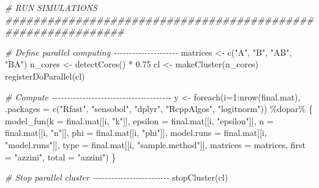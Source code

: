 \documentclass[
  11pt,
]{article}
\newenvironment{Shaded}{\begin{snugshade}}{\end{snugshade}}
\newcommand{\AttributeTok}[1]{\textcolor[rgb]{0.77,0.63,0.00}{#1}}
\newcommand{\CommentTok}[1]{\textcolor[rgb]{0.56,0.35,0.01}{\textit{#1}}}
\newcommand{\DecValTok}[1]{\textcolor[rgb]{0.00,0.00,0.81}{#1}}
\newcommand{\FloatTok}[1]{\textcolor[rgb]{0.00,0.00,0.81}{#1}}
\newcommand{\FunctionTok}[1]{\textcolor[rgb]{0.00,0.00,0.00}{#1}}
\newcommand{\NormalTok}[1]{#1}
\newcommand{\OtherTok}[1]{\textcolor[rgb]{0.56,0.35,0.01}{#1}}
\newcommand{\SpecialCharTok}[1]{\textcolor[rgb]{0.00,0.00,0.00}{#1}}
\newcommand{\StringTok}[1]{\textcolor[rgb]{0.31,0.60,0.02}{#1}}
\begin{document}
\begin{Shaded}
\begin{Highlighting}[]
\CommentTok{\# RUN SIMULATIONS \#\#\#\#\#\#\#\#\#\#\#\#\#\#\#\#\#\#\#\#\#\#\#\#\#\#\#\#\#\#\#\#\#\#\#\#\#\#\#\#\#\#\#\#\#\#\#\#\#\#\#\#\#\#\#\#\#\#\#\#\#}

\CommentTok{\# Define parallel computing {-}{-}{-}{-}{-}{-}{-}{-}{-}{-}{-}{-}{-}{-}{-}{-}{-}{-}{-}{-}{-}}
\NormalTok{matrices }\OtherTok{\textless{}{-}} \FunctionTok{c}\NormalTok{(}\StringTok{"A"}\NormalTok{, }\StringTok{"B"}\NormalTok{, }\StringTok{"AB"}\NormalTok{, }\StringTok{"BA"}\NormalTok{)}
\NormalTok{n\_cores }\OtherTok{\textless{}{-}} \FunctionTok{detectCores}\NormalTok{() }\SpecialCharTok{*} \FloatTok{0.75}
\NormalTok{cl }\OtherTok{\textless{}{-}} \FunctionTok{makeCluster}\NormalTok{(n\_cores)}
\FunctionTok{registerDoParallel}\NormalTok{(cl)}

\CommentTok{\# Compute {-}{-}{-}{-}{-}{-}{-}{-}{-}{-}{-}{-}{-}{-}{-}{-}{-}{-}{-}{-}{-}{-}{-}{-}{-}{-}{-}{-}{-}{-}{-}{-}{-}{-}{-}{-}{-}{-}{-}}
\NormalTok{y }\OtherTok{\textless{}{-}} \FunctionTok{foreach}\NormalTok{(}\AttributeTok{i=}\DecValTok{1}\SpecialCharTok{:}\FunctionTok{nrow}\NormalTok{(final.mat),}
             \AttributeTok{.packages =} \FunctionTok{c}\NormalTok{(}\StringTok{"Rfast"}\NormalTok{, }\StringTok{"sensobol"}\NormalTok{, }\StringTok{"dplyr"}\NormalTok{, }\StringTok{"RcppAlgos"}\NormalTok{,}
                           \StringTok{"logitnorm"}\NormalTok{)) }\SpecialCharTok{\%dopar\%}
\NormalTok{  \{}
    \FunctionTok{model\_fun}\NormalTok{(}\AttributeTok{k =}\NormalTok{ final.mat[[i, }\StringTok{"k"}\NormalTok{]],}
              \AttributeTok{epsilon =}\NormalTok{ final.mat[[i, }\StringTok{"epsilon"}\NormalTok{]],}
              \AttributeTok{n =}\NormalTok{ final.mat[[i, }\StringTok{"n"}\NormalTok{]],}
              \AttributeTok{phi =}\NormalTok{ final.mat[[i, }\StringTok{"phi"}\NormalTok{]],}
              \AttributeTok{model.runs =}\NormalTok{ final.mat[[i, }\StringTok{"model.runs"}\NormalTok{]],}
              \AttributeTok{type =}\NormalTok{ final.mat[[i, }\StringTok{"sample.method"}\NormalTok{]],}
              \AttributeTok{matrices =}\NormalTok{ matrices, }
              \AttributeTok{first =} \StringTok{"azzini"}\NormalTok{, }
              \AttributeTok{total =} \StringTok{"azzini"}\NormalTok{)}
\NormalTok{  \}}

\CommentTok{\# Stop parallel cluster {-}{-}{-}{-}{-}{-}{-}{-}{-}{-}{-}{-}{-}{-}{-}{-}{-}{-}{-}{-}{-}{-}{-}{-}{-}}
\FunctionTok{stopCluster}\NormalTok{(cl)}
\end{Highlighting}
\end{Shaded}
\end{document}
